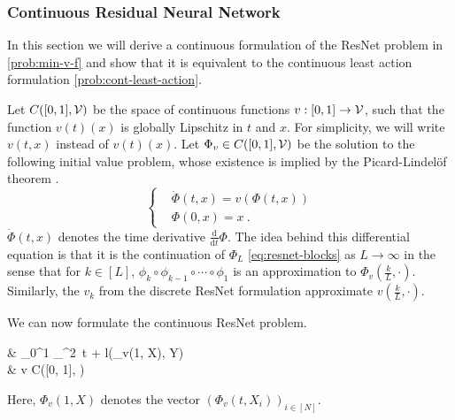 \subsubsection{Continuous Residual Neural Network} 
In this section we will derive a continuous formulation of the ResNet problem in \ref{prob:min-v-f} and show that it is equivalent to the continuous least action formulation \ref{prob:cont-least-action}.

Let $C([0, 1], \mathcal{V})$ be the space of continuous functions $v: [0, 1] \rightarrow \mathcal{V}$, such that the function $v(t)(x)$ is globally Lipschitz in $t$ and $x$.
For simplicity, we will write $v(t, x)$ instead of $v(t)(x)$.
Let $\Phi_v \in C([0, 1], \mathcal{V})$ be the solution to the following initial value problem, whose existence is implied by the Picard-Lindelöf theorem \cite[Theorem 1.2.3]{arino06}.
\begin{equation}
	\label{eq:phi-v-differential-equation}
	\begin{cases}
		&\dot{\Phi}(t, x) = v(\Phi(t, x))\\
		&\Phi(0, x) = x \ .
	\end{cases}
\end{equation}
$\dot{\Phi}(t, x)$ denotes the time derivative $\frac{\mathrm{d}}{\mathrm{d}t}\Phi$.
The idea behind this differential equation is that it is the continuation of $\Phi_L$ \ref{eq:resnet-blocks} as $L \rightarrow \infty$  in the sense that for $k \in [L]$, $\phi_k \circ \phi_{k-1} \circ \cdots \circ \phi_1$ is an approximation to $\Phi_v(\frac{k}{L}, \cdot)$.
Similarly, the $v_k$ from the discrete ResNet formulation approximate $v(\frac{k}{L}, \cdot)$.

We can now formulate the continuous ResNet problem.
\begin{problem}
	\label{prob:resnet-limit}
	\begin{cases}
		&  \int_{0}^{1} _\cV^2~t
		+ l(\Phi_v(1, X), Y)\\
		& v \in C([0, 1], \cV)\\
	\end{cases}
\end{problem}
Here, $\Phi_v(1, X)$ denotes the vector $(\Phi_v(t, X_i))_{i \in [N]}$.

